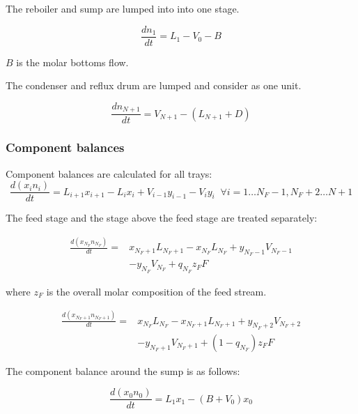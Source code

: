 The reboiler and sump are lumped into into one stage. 

\begin{equation}
    \frac{dn_1}{dt} =  L_1 - V_0 - B
\end{equation}

$B$ is the molar bottoms flow.

The condenser and reflux drum are lumped and consider as one unit.

\begin{equation}
    \frac{dn_{N+1}}{dt} = V_{N+1}-(L_{N+1} + D)    
\end{equation}


\subsubsection{Component balances}

Component balances are calculated for all trays:
\begin{equation}
   \frac{d(x_{i} n_{i})}{dt}= L_{i+1} x_{i+1} - L_i x_{i} + V_{i-1} y_{i-1} -V_i y_i  \;\; \forall i=1 \dots N_F-1, N_F+2 \dots N+1
\end{equation}

The  feed stage and the stage above the feed stage are treated separately:

\begin{equation}
\begin{split}
 \frac{d(x_{N_F} n_{N_F})}{dt} =  &  x_{N_F+1}L_{N_F+1}  - x_{N_F}L_{N_F} +  y_{N_F-1}V_{N_F-1} \\ & -y_{N_F}V_{N_F} + q_{N_F}z_FF   
\end{split}
\end{equation}

where $z_F$ is the overall molar composition of the feed stream.

\begin{equation}
\begin{split}
    \frac{d(x_{N_F+1} n_{N_F+1})}{dt} =  & x_{N_F}L_{N_F} - x_{N_F+1}L_{N_F+1} +  y_{N_F+2}V_{N_F+2}   \\ & -y_{N_F+1}V_{N_F+1}  + (1-q_{N_F})z_FF 
\end{split}
\end{equation}

The component balance around the sump is as follows:

\begin{equation}
    \frac{d(x_{0} n_{0})}{dt} = L_1 x_1 - (B + V_0) x_0 
\end{equation}

